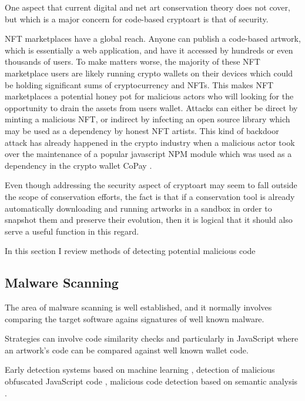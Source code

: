 One aspect that current digital and net art conservation theory does not cover, but which is a major concern for code-based cryptoart is that of security.

NFT marketplaces have a global reach. Anyone can publish a code-based artwork, which is essentially a web application, and have it accessed by hundreds or even thousands of users. To make matters worse, the majority of these NFT marketplace users are likely running crypto wallets on their devices which could be holding significant sums of cryptocurrency and NFTs. This makes NFT marketplaces a potential honey pot for malicious actors who will looking for the opportunity to drain the assets from users wallet. Attacks can either be direct by minting a malicious NFT, or indirect by infecting an open source library which may be used as a dependency by honest NFT artists. This kind of backdoor attack has already happened in the crypto industry when a malicious actor took over the maintenance of a popular javascript NPM module which was used as a dependency in the crypto wallet CoPay \cite{haworthPopularJavaScriptDependency2018}.

Even though addressing the security aspect of cryptoart may seem to fall outside the scope of conservation efforts, the fact is that if a conservation tool is already automatically downloading and running artworks in a sandbox in order to snapshot them and preserve their evolution, then it is logical that it should also serve a useful function in this regard.

In this section I review methods of detecting potential malicious code

\subsection{Malware Scanning}

The area of malware scanning is well established, and it normally involves comparing the target software agains signatures of well known malware.


Strategies can involve code similarity checks \cite{ragkhitwetsagulComparisonCodeSimilarity2018} and particularly in JavaScript \cite{alfagehCloneDetectionTechniques2020} where an artwork's code can be compared against well known wallet code.


Early detection systems based on machine learning \cite{schuttEarlyDetectionMalicious2012}, detection of malicious obfuscated JavaScript code \cite{likarishObfuscatedMaliciousJavascript2009} \cite{fassJaStFullySyntactic2018}, malicious code detection based on semantic analysis \cite{fangDetectingMaliciousJavaScript2020}.


